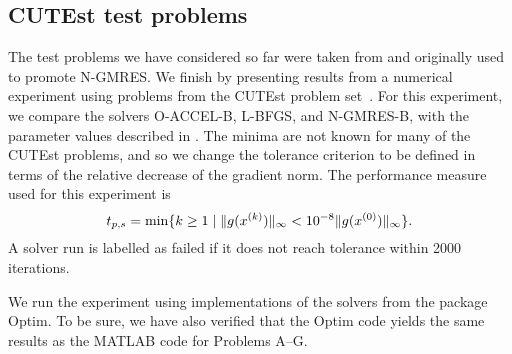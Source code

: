 \documentclass[main.tex]{subfiles}
\begin{document}
\subsection{CUTEst test problems}
The test problems we have considered so far were taken from
\citet{sterck2013steepest} and originally used to promote N-GMRES. We
finish by presenting results from a numerical experiment using
problems from the CUTEst problem set~\cite{gould2015cutest}.  For this
experiment, we compare the solvers O-ACCEL-B, L-BFGS, and N-GMRES-B,
with the parameter values described in
.  The minima are not known for many of
the CUTEst problems, and so we change the tolerance criterion to be
defined in terms of the relative decrease of the gradient norm.  The
performance measure used for this experiment is
\begin{equation}\label{eq:def_performance_measure_cutest}
  t_{p,s} = \min\{k\geq 1 \mid \|g(x^{(k)})\|_\infty < 10^{-8}\|g(x^{(0)})\|_\infty\}.
\end{equation}
A solver run is labelled as failed if it does not reach tolerance
within \num{2000} iterations.

We run the experiment using implementations of the solvers from the
package Optim. To be sure, we have also verified
that the Optim code yields the same results as the MATLAB code for
Problems A--G.
\end{document}
